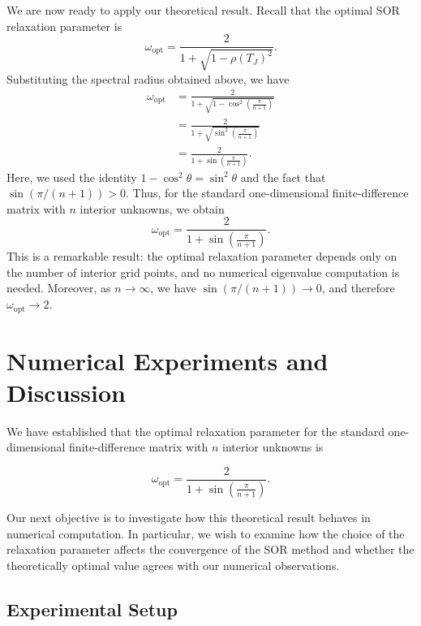 \documentclass[11pt,a4paper]{article}
\theoremstyle{definition}
\theoremstyle{remark}
\begin{document}
We are now ready to apply our theoretical
result. Recall that the optimal SOR
relaxation parameter is
\[
    \omega_{\mathrm{opt}}
    =
    \frac{2}{1+\sqrt{1-\rho(T_J)^2}}.
\]
Substituting the spectral radius obtained
above, we have
\[
\begin{aligned}
    \omega_{\mathrm{opt}}
    &=
    \frac{2}{
        1+\sqrt{
        1-\cos^2\left(\frac{\pi}{n+1}\right)
        }
    }\\[6pt]
    &=
    \frac{2}{
        1+\sqrt{
        \sin^2\left(\frac{\pi}{n+1}\right)
        }
    }\\[6pt]
    &=
    \frac{2}{
        1+\sin\left(\frac{\pi}{n+1}\right)
    }.
\end{aligned}
\]
Here, we used the identity
$1-\cos^2\theta=\sin^2\theta$ and the
fact that $\sin(\pi/(n+1))>0$.
Thus, for the standard one-dimensional
finite-difference matrix with $n$ interior
unknowns, we obtain
\begin{equation}
    \boxed{
    \omega_{\mathrm{opt}}
    =
    \frac{2}{
        1+\sin\left(\frac{\pi}{n+1}\right)
    }.
    }
    \label{eq:sor_optimal_fd}
\end{equation}
This is a remarkable result: the optimal
relaxation parameter depends only on the
number of interior grid points, and no
numerical eigenvalue computation is needed.
Moreover, as $n\to\infty$, we have
$\sin(\pi/(n+1))\to0$, and therefore
$\omega_{\mathrm{opt}}\to2$.

\section{Numerical Experiments and Discussion}

We have established that the optimal relaxation
parameter for the standard one-dimensional
finite-difference matrix with $n$ interior
unknowns is

\begin{equation}
    \boxed{
    \omega_{\mathrm{opt}}
    =
    \frac{2}{
    1+\sin\left(\frac{\pi}{n+1}\right)
    }.
    }
    \label{eq:sor_numerical_optimal}
\end{equation}

Our next objective is to investigate how this
theoretical result behaves in numerical
computation. In particular, we wish to examine
how the choice of the relaxation parameter
affects the convergence of the SOR method
and whether the theoretically optimal value
agrees with our numerical observations.

\subsection{Experimental Setup}
\end{document}
